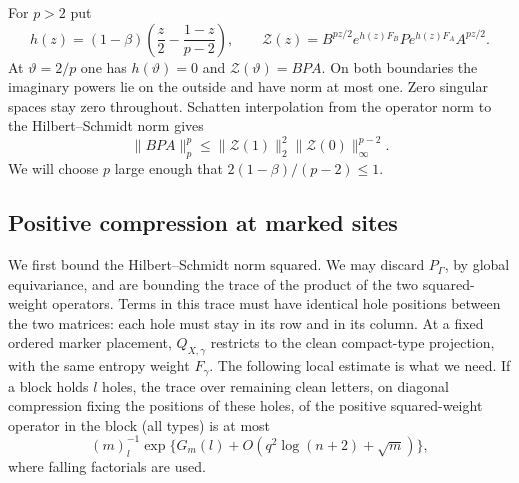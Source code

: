 For $p>2$ put
\[
 h(z)=(1-\beta)\left(\frac z2-\frac{1-z}{p-2}\right),\qquad
 \mathcal Z(z)=B^{pz/2}e^{h(z)F_B}P e^{h(z)F_A}A^{pz/2}.
\]
At $\vartheta=2/p$ one has $h(\vartheta)=0$ and $\mathcal Z(\vartheta)=BPA$.
On both boundaries the imaginary powers lie on the outside and have
norm at most one. Zero singular spaces stay zero throughout.
Schatten interpolation from the operator norm to the Hilbert--Schmidt
norm gives
\begin{equation}\label{s:lowering-weighted-strip}
 \|BPA\|_p^p\le\|\mathcal Z(1)\|_2^2\|\mathcal Z(0)\|_\infty^{p-2}.
\end{equation}
We will choose $p$ large enough that $2(1-\beta)/(p-2)\le1$.

\subsection{Positive compression at marked sites}
We first bound the Hilbert--Schmidt norm squared. We may discard \(P_\Gamma\), by global equivariance, and are bounding the trace of the product of the two squared-weight operators. Terms in this trace must have identical hole positions between the two matrices: each hole must stay in its row and in its column. At a fixed ordered marker placement, $Q_{X,\gamma}$ restricts to the clean compact-type projection, with the same entropy weight $F_\gamma$. The following local estimate is what we need. If a block holds \(l\) holes, the trace over remaining clean letters, on diagonal compression fixing the positions of these holes, of the positive squared-weight operator in the block (all types) is at most
\begin{equation}
         (m)_l^{-1}\exp\{G_m(l)+O(q^2\log(n+2)+\sqrt m)\},                 \label{ten:lowering:eq:8}
\end{equation}
where falling factorials are used.

